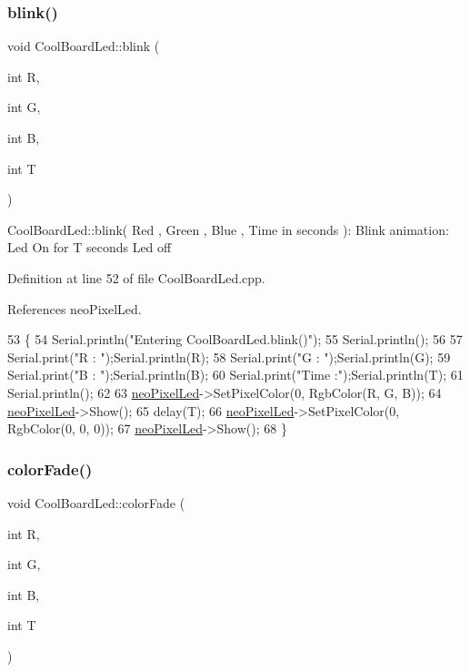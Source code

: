 \subsubsection{\texorpdfstring{blink()}{blink()}}
{\footnotesize\ttfamily void Cool\+Board\+Led\+::blink (\begin{DoxyParamCaption}\item[{int}]{R,  }\item[{int}]{G,  }\item[{int}]{B,  }\item[{int}]{T }\end{DoxyParamCaption})}

Cool\+Board\+Led\+::blink( Red , Green , Blue , Time in seconds )\+: Blink animation\+: Led On for T seconds Led off 

Definition at line 52 of file Cool\+Board\+Led.\+cpp.



References neo\+Pixel\+Led.


\begin{DoxyCode}
53 \{
54     Serial.println(\textcolor{stringliteral}{"Entering CoolBoardLed.blink()"});
55     Serial.println();
56 
57     Serial.print(\textcolor{stringliteral}{"R : "});Serial.println(R);
58     Serial.print(\textcolor{stringliteral}{"G : "});Serial.println(G);
59     Serial.print(\textcolor{stringliteral}{"B : "});Serial.println(B);
60     Serial.print(\textcolor{stringliteral}{"Time :"});Serial.println(T);
61     Serial.println();   
62 
63     \hyperlink{classCoolBoardLed_ac2c13fa462a010cd9242bf297c013923}{neoPixelLed}->SetPixelColor(0, RgbColor(R, G, B));
64     \hyperlink{classCoolBoardLed_ac2c13fa462a010cd9242bf297c013923}{neoPixelLed}->Show();
65     delay(T);
66     \hyperlink{classCoolBoardLed_ac2c13fa462a010cd9242bf297c013923}{neoPixelLed}->SetPixelColor(0, RgbColor(0, 0, 0));
67     \hyperlink{classCoolBoardLed_ac2c13fa462a010cd9242bf297c013923}{neoPixelLed}->Show();
68 \}
\end{DoxyCode}
\mbox{\label{classCoolBoardLed_a6dbfe23988f43e1242cd05e69b13ff30}} 
\subsubsection{\texorpdfstring{color\+Fade()}{colorFade()}}
{\footnotesize\ttfamily void Cool\+Board\+Led\+::color\+Fade (\begin{DoxyParamCaption}\item[{int}]{R,  }\item[{int}]{G,  }\item[{int}]{B,  }\item[{int}]{T }\end{DoxyParamCaption})}

